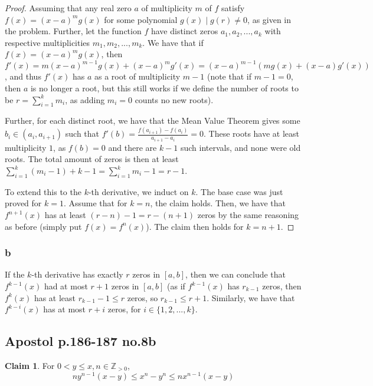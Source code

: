 \documentclass[12pt,letterpaper]{article}
\theoremstyle{definition}
\newtheorem*{claim}{Claim}
\newcommand{\Zg}{\mathbb{Z}_{>0}}
\begin{document}
\begin{proof}
  Assuming that any real zero $a$ of multiplicity $m$ of $f$ satisfy $f(x) =
  (x-a)^mg(x)$ for some polynomial $g(x) \mid g(r) \neq 0$, as given in the
  problem. Further, let the function $f$ have distinct zeros $a_1,a_2,...,a_k$ with
  respective multiplicities $m_1,m_2,...,m_k$.  We have that if $f(x) =
  (x-a)^mg(x)$, then $f'(x) = m(x-a)^{m-1}g(x) +
  (x-a)^mg'(x) = (x-a)^{m-1}(mg(x) + (x-a)g'(x))$, and thus $f'(x)$ has $a$ as a
  root of multiplicity $m - 1$ (note that if $m-1 = 0$, then $a$ is no longer a
  root, but this still works if we define the number of roots to be $r =
  \sum_{i=1}^km_i$, as adding $m_i = 0$ counts no new roots).

  Further, for each distinct root, we have that the Mean Value Theorem gives some
  $b_i \in (a_i,a_{i+1})$ such that $f'(b) = \frac{f(a_{i+1}) - f(a_i)}{a_{i+1} -
    a_i} = 0$. These roots have at least multiplicity $1$, as $f(b) = 0$ and
  there are $k - 1$
  such intervals, and none were old roots. The total amount of zeros is then at
  least $\sum_{i=1}^k(m_i-1) + k - 1 = \sum_{i=1}^km_i - 1 = r - 1$.

  To extend this to the $k$-th derivative, we induct on $k$. The base case was
  just proved for $k = 1$. Assume that for $k = n$, the claim holds. Then, we
  have that $f^{n+1}(x)$ has at least $(r - n) - 1 = r - (n+1)$ zeros by the
  same reasoning as before (simply put $f(x) = f^n(x)$). The claim then holds
  for $k = n+1$.
\end{proof}

\subsubsection*{b}

If the $k$-th derivative has exactly $r$ zeros in $[a,b]$, then we can conclude
that $f^{k-1}(x)$ had at most $r + 1$ zeros in $[a,b]$ (as if $f^{k-1}(x)$ has
$r_{k-1}$ zeros, then $f^k(x)$ has at least $r_{k-1} - 1 \leq r$ zeros, so
$r_{k-1} \leq r + 1$. Similarly, we have that $f^{k - i}(x)$ has at most $r + i$
zeros, for $i \in \{1,2,...,k \}$. 

\subsection*{Apostol p.186-187 no.8b}

\begin{claim}
  For $0 < y \leq x, n \in \Zg$,
  \[
    ny^{n-1}(x-y) \leq x^n - y^n \leq nx^{n-1}(x-y)
  \]
\end{claim}
\end{document}
